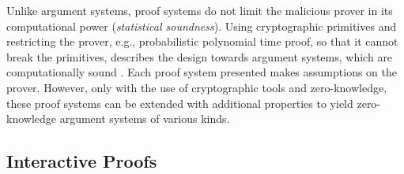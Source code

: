 Unlike argument systems, proof systems do not limit the malicious prover in its computational power (\textit{statistical soundness}). Using cryptographic primitives and restricting the prover, e.g., probabilistic polynomial time proof, so that it cannot break the primitives, describes the design towards argument systems, which are computationally sound \citep{ArgSystems, MicaliArgSys}. Each proof system presented makes assumptions on the prover. However, only with the use of cryptographic tools and zero-knowledge, these proof systems can be extended with additional properties to yield zero-knowledge argument systems of various kinds.

\subsection{Interactive Proofs}

